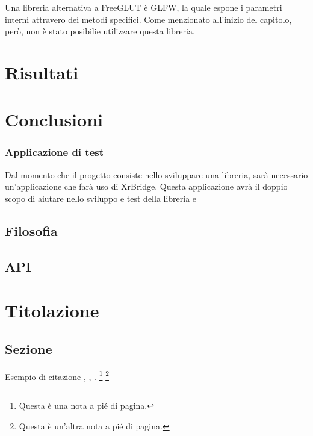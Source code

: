 \documentclass[twoside]{supsistudent}
\begin{document}
Una libreria alternativa a FreeGLUT è GLFW, la quale espone i parametri interni attravero dei metodi specifici. Come menzionato all'inizio del capitolo, però, non è stato posibilie utilizzare questa libreria.

\chapter{Risultati}

\chapter{Conclusioni}

\subsection{Applicazione di test}

Dal momento che il progetto consiste nello sviluppare una libreria, sarà necessario un'applicazione che farà uso di XrBridge. Questa applicazione avrà il doppio scopo di aiutare nello sviluppo e test della libreria e

\section{Filosofia}


\section{API}


\chapter{Titolazione}

\lipsum[13]

\section{Sezione}

\lipsum[23]
Esempio di citazione \cite{4538384}, \cite{5357331,4523385}, \cite{1705631}.
\footnote{Questa \`e una nota a pi\'e di pagina.}
\footnote{Questa \`e un'altra nota a pi\'e di pagina.}
\lipsum[23]
\end{document}
